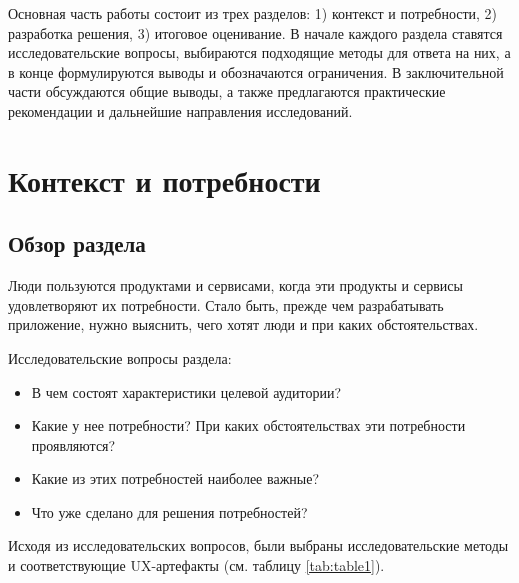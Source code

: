 \documentclass[pdflatex,sn-mathphys-num]{sn-jnl}%
\theoremstyle{thmstyleone}%
\theoremstyle{thmstyletwo}%
\theoremstyle{thmstylethree}%
\begin{document}
Основная часть работы состоит из трех разделов: 1) контекст и потребности, 2) разработка решения, 3) итоговое оценивание. В начале каждого раздела ставятся исследовательские вопросы, выбираются подходящие методы для ответа на них, а в конце формулируются выводы и обозначаются ограничения. В заключительной части обсуждаются общие выводы, а также предлагаются практические рекомендации и дальнейшие направления исследований.

\newpage

\section{Контекст и потребности}\label{Context and Needs}

\subsection{Обзор раздела}\label{Overview1}

Люди пользуются продуктами и сервисами, когда эти продукты и сервисы удовлетворяют их потребности. Стало быть, прежде чем разрабатывать приложение, нужно выяснить, чего хотят люди и при каких обстоятельствах.

\bigskip
Исследовательские вопросы раздела:

\begin{itemize}
    \item В чем состоят характеристики целевой аудитории?
    \item Какие у нее потребности? При каких обстоятельствах эти потребности проявляются?
    \item Какие из этих потребностей наиболее важные?
    \item Что уже сделано для решения потребностей?
\end{itemize}

Исходя из исследовательских вопросов, были выбраны исследовательские методы и соответствующие UX-артефакты (см. таблицу \ref{tab:table1}).
\end{document}
